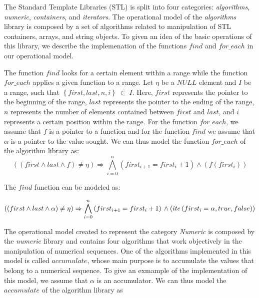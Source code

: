 \documentclass[a4paper]{llncs}
\begin{document}
The Standard Template Libraries (STL) is split into
four categories: \textit{algorithms}, \textit{numeric},
\textit{containers}, and \textit{iterators}. The operational model
of the \textit{algorithms} library is composed by a set of algorithms
related to manipulation of STL containers, arrays, and string objects.
To given an idea of the basic operations of this library, we describe
the implemenation of the functions $find$ and $for\_each$ in our
operational model.

The function $find$ looks for a certain element within a range while the
function $for\_each$ applies a given function to a range. Let $\eta$ be
a $NULL$ element and $I$ be a range, such that $\left\{first, last, n, i\right\}\:\subset\:I$.
Here, $first$ represents the pointer to the beginning of the range, $last$ represents
the pointer to the ending of the range, $n$ represents the number of elements
contained between $first$ and $last$, and $i$ represents a certain position
within the range. For the function $for\_each$, we assume that $f$ is a pointer
to a function and for the function $find$ we assume that $\alpha$ is a pointer to the value sought.
We can thus model the function $for\_each$ of the algorithm library as:
%
\begin{equation}
\left(\left(first \wedge last \wedge f\right) \neq \eta\right) \Rightarrow
\bigwedge^{n}_{i=0} \left(first_{i+1} = first_{i} +1\right) \wedge \left(f\left(first_{i}\right)\right)
\label{eq:model-for-each}
\end{equation}

The $find$ function can be modeled as:

\begin{equation}\left(\left(first \wedge last \wedge \alpha\right) \neq \eta\right) \Rightarrow
\bigwedge^{n}_{i=0} \left(first_{i+1} = first_{i} +1\right)\\ \wedge \left(ite\left(first_{i} = \alpha, true,  false\right)\right)
\label{eq:model-find}
\end{equation}

The operational model created to represent the category \textit{Numeric} is
composed by the \textit{numeric} library and contains four algorithms that work
objectively in the manipulation of numerical sequences. One of the algorithms
implemented in this model is called $accumulate$, whose main purpose is
to accumulate the values that belong to a numerical sequence. To give an exmample
of the implementation of this model, we assume that $\alpha$ is an accumulator.
We can thus model the $accumulate$ of the algorithm library as
\end{document}

